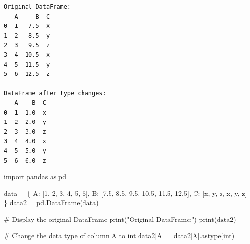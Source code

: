 \documentclass[
  english,
  letterpaper,
  DIV=11,
  numbers=noendperiod]{scrreprt}
\newenvironment{Shaded}{\begin{snugshade}}{\end{snugshade}}
\newcommand{\BuiltInTok}[1]{\textcolor[rgb]{0.00,0.23,0.31}{#1}}
\newcommand{\CommentTok}[1]{\textcolor[rgb]{0.37,0.37,0.37}{#1}}
\newcommand{\ImportTok}[1]{\textcolor[rgb]{0.00,0.46,0.62}{#1}}
\newcommand{\NormalTok}[1]{\textcolor[rgb]{0.00,0.23,0.31}{#1}}
\newcommand{\OperatorTok}[1]{\textcolor[rgb]{0.37,0.37,0.37}{#1}}
\newcommand{\StringTok}[1]{\textcolor[rgb]{0.13,0.47,0.30}{#1}}
\begin{document}
\begin{verbatim}
Original DataFrame:
   A     B  C
0  1   7.5  x
1  2   8.5  y
2  3   9.5  z
3  4  10.5  x
4  5  11.5  y
5  6  12.5  z

DataFrame after type changes:
   A    B  C
0  1  1.0  x
1  2  2.0  y
2  3  3.0  z
3  4  4.0  x
4  5  5.0  y
5  6  6.0  z
\end{verbatim}

\begin{Shaded}
\begin{Highlighting}[]
\ImportTok{import}\NormalTok{ pandas }\ImportTok{as}\NormalTok{ pd}


\NormalTok{data }\OperatorTok{=}\NormalTok{ \{}
    \StringTok{\textquotesingle{}A\textquotesingle{}}\NormalTok{: [}\StringTok{\textquotesingle{}1\textquotesingle{}}\NormalTok{, }\StringTok{\textquotesingle{}2\textquotesingle{}}\NormalTok{, }\StringTok{\textquotesingle{}3\textquotesingle{}}\NormalTok{, }\StringTok{\textquotesingle{}4\textquotesingle{}}\NormalTok{, }\StringTok{\textquotesingle{}5\textquotesingle{}}\NormalTok{, }\StringTok{\textquotesingle{}6\textquotesingle{}}\NormalTok{],}
    \StringTok{\textquotesingle{}B\textquotesingle{}}\NormalTok{: [}\StringTok{\textquotesingle{}7.5\textquotesingle{}}\NormalTok{, }\StringTok{\textquotesingle{}8.5\textquotesingle{}}\NormalTok{, }\StringTok{\textquotesingle{}9.5\textquotesingle{}}\NormalTok{, }\StringTok{\textquotesingle{}10.5\textquotesingle{}}\NormalTok{, }\StringTok{\textquotesingle{}11.5\textquotesingle{}}\NormalTok{, }\StringTok{\textquotesingle{}12.5\textquotesingle{}}\NormalTok{],}
    \StringTok{\textquotesingle{}C\textquotesingle{}}\NormalTok{: [}\StringTok{\textquotesingle{}x\textquotesingle{}}\NormalTok{, }\StringTok{\textquotesingle{}y\textquotesingle{}}\NormalTok{, }\StringTok{\textquotesingle{}z\textquotesingle{}}\NormalTok{, }\StringTok{\textquotesingle{}x\textquotesingle{}}\NormalTok{, }\StringTok{\textquotesingle{}y\textquotesingle{}}\NormalTok{, }\StringTok{\textquotesingle{}z\textquotesingle{}}\NormalTok{]}
\NormalTok{\}}
\NormalTok{data2 }\OperatorTok{=}\NormalTok{ pd.DataFrame(data)}

\CommentTok{\# Display the original DataFrame}
\BuiltInTok{print}\NormalTok{(}\StringTok{"Original DataFrame:"}\NormalTok{)}
\BuiltInTok{print}\NormalTok{(data2)}

\CommentTok{\# Change the data type of column \textquotesingle{}A\textquotesingle{} to int}
\NormalTok{data2[}\StringTok{\textquotesingle{}A\textquotesingle{}}\NormalTok{] }\OperatorTok{=}\NormalTok{ data2[}\StringTok{\textquotesingle{}A\textquotesingle{}}\NormalTok{].astype(}\BuiltInTok{int}\NormalTok{)}


\end{Highlighting}
\end{Shaded}
\end{document}
